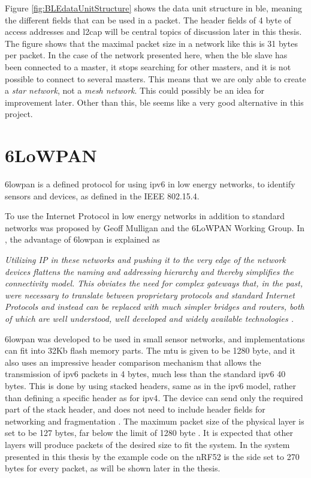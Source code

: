 Figure \ref{fig:BLEdataUnitStructure} shows the data unit structure in \gls{ble}, meaning the different fields that can be used in a packet. The header fields of 4 \gls{byte} of access addresses and \gls{l2cap} will be central topics of discussion later in this thesis. The figure shows that the maximal packet size in a network like this is 31 bytes per packet.  In the case of the network presented here, when the \gls{ble} slave has been connected to a master, it stops searching for other masters, and it is not possible to connect to several masters. This means that we are only able to create a \textit{star network}, not a \textit{mesh network}. This could possibly be an idea for improvement later. Other than this, \gls{ble} seems like a very good alternative in this project. 


\section{6LoWPAN}


\gls{6lowpan} is a defined protocol for using \gls{ipv6} in low energy networks, to identify sensors and devices, as defined in the IEEE 802.15.4. 

To use the Internet Protocol in low energy networks in addition to standard networks was proposed by Geoff Mulligan and the 6LoWPAN Working Group. In \cite{mulligan20076lowpan}, the advantage of \gls{6lowpan} is explained as 

\textit{Utilizing IP  in these networks and pushing it to the very edge of the network devices flattens the naming and addressing hierarchy and  thereby  simplifies  the  connectivity  model. This obviates the need  for  complex  gateways  that,  in  the  past,  were  necessary  to translate   between   proprietary   protocols   and   standard   Internet Protocols and instead can be replaced with much simpler bridges and  routers,  both  of  which  are  well  understood, well  developed and  widely  available  technologies \cite{mulligan20076lowpan}.}


\gls{6lowpan} was developed to be used in small sensor networks, and implementations can fit into 32Kb flash memory parts. The \gls{mtu} is given to be 1280 byte, and it also uses an impressive header comparison mechanism that allows the transmission of \gls{ipv6} packets in 4 bytes, much less than the standard \gls{ipv6} 40 bytes. This is done by using stacked headers, same as in the \gls{ipv6} model, rather than defining a specific header as for \gls{ipv4}. The device can send only the required part of the stack header, and does not need to include header fields for networking and fragmentation \cite{hui2008extending}. The maximum packet size of the physical layer is set to be 127 bytes, far below the limit of 1280 byte \cite{kushalnagar2007transmission}. It is expected that other layers will produce packets of the desired size to fit the system. In the system presented in this thesis by the example code on the nRF52 is the side set to 270 bytes for every packet, as will be shown later in the thesis. 


